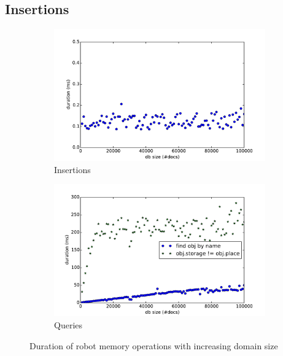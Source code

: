 \subsection{Insertions}
\label{sec:insertions}
\begin{figure}
  \centering
  \begin{subfigure}[b]{0.49\textwidth}
    \includegraphics[width=\textwidth]{plots/insert-durations}
    \caption{Insertions}
    \label{fig:insert-durations}
  \end{subfigure}
  \begin{subfigure}[b]{0.49\textwidth}
    \includegraphics[width=\textwidth]{plots/query-durations}
    \caption{Queries}
    \label{fig:query-durations}
  \end{subfigure}
  \caption[Duration of robot memory operations with increasing domain size]{Duration of robot memory operations with increasing domain size}
  \label{fig:eval-durations-1}
\end{figure}
